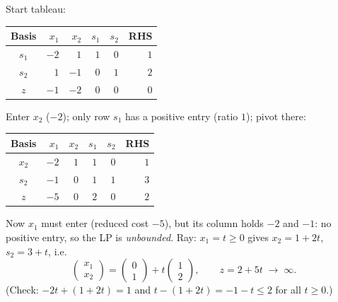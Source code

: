 \begin{solutions}
  \item Start tableau:
        \begin{center}
        \begin{tabular}{c|rrrr|r}
        \hline
        Basis & $x_1$ & $x_2$ & $s_1$ & $s_2$ & RHS\\
        \hline
        $s_1$ & $-2$ & $1$ & $1$ & $0$ & $1$\\
        $s_2$ & $1$ & $-1$ & $0$ & $1$ & $2$\\
        \hline
        $z$ & $-1$ & $-2$ & $0$ & $0$ & $0$\\
        \hline
        \end{tabular}
        \end{center}
        Enter $x_2$ ($-2$); only row $s_1$ has a positive entry (ratio
        $1$); pivot there:
        \begin{center}
        \begin{tabular}{c|rrrr|r}
        \hline
        Basis & $x_1$ & $x_2$ & $s_1$ & $s_2$ & RHS\\
        \hline
        $x_2$ & $-2$ & $1$ & $1$ & $0$ & $1$\\
        $s_2$ & $-1$ & $0$ & $1$ & $1$ & $3$\\
        \hline
        $z$ & $-5$ & $0$ & $2$ & $0$ & $2$\\
        \hline
        \end{tabular}
        \end{center}
        Now $x_1$ must enter (reduced cost $-5$), but its column holds
        $-2$ and $-1$: no positive entry, so the LP is \emph{unbounded}.
        Ray: $x_1=t\ge 0$ gives $x_2=1+2t$, $s_2=3+t$, i.e.
        \[
          \begin{pmatrix}x_1\\ x_2\end{pmatrix}
          =\begin{pmatrix}0\\ 1\end{pmatrix}
           +t\begin{pmatrix}1\\ 2\end{pmatrix},
          \qquad z=2+5t\;\longrightarrow\;\infty .
        \]
        (Check: $-2t+(1+2t)=1$ and $t-(1+2t)=-1-t\le 2$ for all
        $t\ge 0$.)


\end{solutions}

